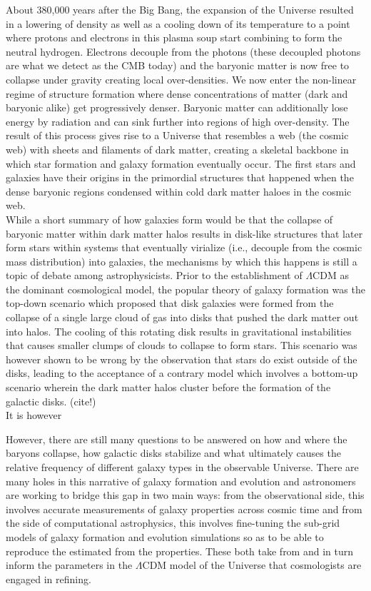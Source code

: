 About 380,000 years after the Big Bang, the expansion of the Universe resulted in a lowering of density as well as a cooling down of its temperature to a point where protons and electrons in this plasma soup start combining to form the neutral hydrogen. Electrons decouple from the photons (these decoupled photons are what we detect as the CMB today) and the baryonic matter is now free to collapse under gravity creating local over-densities. We now enter the non-linear regime of structure formation where dense concentrations of matter (dark and baryonic alike) get progressively denser. Baryonic matter can additionally lose energy by radiation and can sink further into regions of high over-density. The result of this process gives rise to a Universe that resembles a web (the cosmic web) with sheets and filaments of dark matter, creating a skeletal backbone in which star formation and galaxy formation eventually occur. The first stars and galaxies have their origins in the primordial structures that happened when the dense baryonic regions condensed within cold dark matter haloes in the cosmic web.\\

While a short summary of how galaxies form would be that the collapse of baryonic matter within dark matter halos results in disk-like structures that later form stars within systems that eventually virialize (i.e., decouple from the cosmic mass distribution) into galaxies, the mechanisms by which this happens is still a topic of debate among astrophysicists.  Prior to the establishment of $\Lambda$CDM as the dominant cosmological model, the popular theory of galaxy formation was the top-down scenario \citep{1978ApJ...225..357S} which proposed that disk galaxies were formed from the collapse of a single large cloud of gas \citep{1962ApJ...136..748E} into disks that pushed the dark matter out into halos. The cooling of this rotating disk results in gravitational instabilities that causes smaller clumps of clouds to collapse to form stars. This scenario was however shown to be wrong by the observation that stars do exist outside of the disks, leading to the acceptance of a contrary model which involves a bottom-up scenario wherein the dark matter halos cluster before the formation of the galactic disks. (cite!) \\

It is however 

However, there are still many questions to be answered on how and where the baryons collapse, how galactic disks stabilize and what ultimately causes the relative frequency of different galaxy types in the observable Universe. There are many holes in this narrative of galaxy formation and evolution and astronomers are working to bridge this gap in two main ways: from the observational side, this involves accurate measurements of galaxy properties across cosmic time and from the side of computational astrophysics, this involves fine-tuning the sub-grid models of galaxy formation and evolution simulations so as to be able to reproduce the estimated from the properties. These both take from and in turn inform the parameters in the $\Lambda$CDM model of the Universe that cosmologists are engaged in refining.\\


